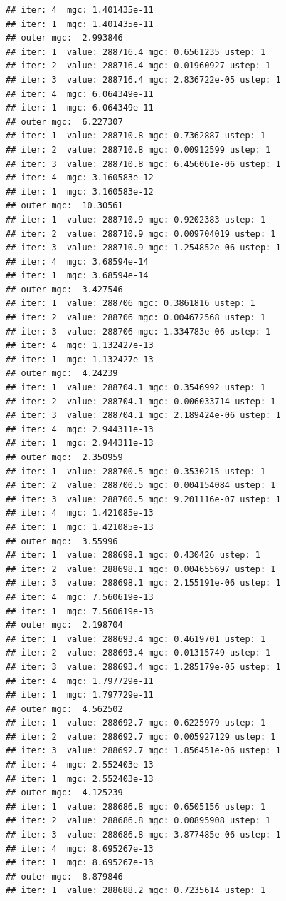\documentclass{article}\usepackage[]{graphicx}\usepackage[]{xcolor}
\makeatletter
\newenvironment{kframe}{%
 \def\at@end@of@kframe{}%
 \ifinner\ifhmode%
  \def\at@end@of@kframe{\end{minipage}}%
  \begin{minipage}{\columnwidth}%
 \fi\fi%
 \def\FrameCommand##1{\hskip\@totalleftmargin \hskip-\fboxsep
 \colorbox{shadecolor}{##1}\hskip-\fboxsep
     \hskip-\linewidth \hskip-\@totalleftmargin \hskip\columnwidth}%
 \MakeFramed {\advance\hsize-\width
   \@totalleftmargin\z@ \linewidth\hsize
   \@setminipage}}%
 {\par\unskip\endMakeFramed%
 \at@end@of@kframe}
\newenvironment{knitrout}{}{} %
\makeatother
\begin{document}
\begin{knitrout}
\begin{kframe}
\begin{verbatim}
## iter: 4  mgc: 1.401435e-11 
## iter: 1  mgc: 1.401435e-11 
## outer mgc:  2.993846 
## iter: 1  value: 288716.4 mgc: 0.6561235 ustep: 1 
## iter: 2  value: 288716.4 mgc: 0.01960927 ustep: 1 
## iter: 3  value: 288716.4 mgc: 2.836722e-05 ustep: 1 
## iter: 4  mgc: 6.064349e-11 
## iter: 1  mgc: 6.064349e-11 
## outer mgc:  6.227307 
## iter: 1  value: 288710.8 mgc: 0.7362887 ustep: 1 
## iter: 2  value: 288710.8 mgc: 0.00912599 ustep: 1 
## iter: 3  value: 288710.8 mgc: 6.456061e-06 ustep: 1 
## iter: 4  mgc: 3.160583e-12 
## iter: 1  mgc: 3.160583e-12 
## outer mgc:  10.30561 
## iter: 1  value: 288710.9 mgc: 0.9202383 ustep: 1 
## iter: 2  value: 288710.9 mgc: 0.009704019 ustep: 1 
## iter: 3  value: 288710.9 mgc: 1.254852e-06 ustep: 1 
## iter: 4  mgc: 3.68594e-14 
## iter: 1  mgc: 3.68594e-14 
## outer mgc:  3.427546 
## iter: 1  value: 288706 mgc: 0.3861816 ustep: 1 
## iter: 2  value: 288706 mgc: 0.004672568 ustep: 1 
## iter: 3  value: 288706 mgc: 1.334783e-06 ustep: 1 
## iter: 4  mgc: 1.132427e-13 
## iter: 1  mgc: 1.132427e-13 
## outer mgc:  4.24239 
## iter: 1  value: 288704.1 mgc: 0.3546992 ustep: 1 
## iter: 2  value: 288704.1 mgc: 0.006033714 ustep: 1 
## iter: 3  value: 288704.1 mgc: 2.189424e-06 ustep: 1 
## iter: 4  mgc: 2.944311e-13 
## iter: 1  mgc: 2.944311e-13 
## outer mgc:  2.350959 
## iter: 1  value: 288700.5 mgc: 0.3530215 ustep: 1 
## iter: 2  value: 288700.5 mgc: 0.004154084 ustep: 1 
## iter: 3  value: 288700.5 mgc: 9.201116e-07 ustep: 1 
## iter: 4  mgc: 1.421085e-13 
## iter: 1  mgc: 1.421085e-13 
## outer mgc:  3.55996 
## iter: 1  value: 288698.1 mgc: 0.430426 ustep: 1 
## iter: 2  value: 288698.1 mgc: 0.004655697 ustep: 1 
## iter: 3  value: 288698.1 mgc: 2.155191e-06 ustep: 1 
## iter: 4  mgc: 7.560619e-13 
## iter: 1  mgc: 7.560619e-13 
## outer mgc:  2.198704 
## iter: 1  value: 288693.4 mgc: 0.4619701 ustep: 1 
## iter: 2  value: 288693.4 mgc: 0.01315749 ustep: 1 
## iter: 3  value: 288693.4 mgc: 1.285179e-05 ustep: 1 
## iter: 4  mgc: 1.797729e-11 
## iter: 1  mgc: 1.797729e-11 
## outer mgc:  4.562502 
## iter: 1  value: 288692.7 mgc: 0.6225979 ustep: 1 
## iter: 2  value: 288692.7 mgc: 0.005927129 ustep: 1 
## iter: 3  value: 288692.7 mgc: 1.856451e-06 ustep: 1 
## iter: 4  mgc: 2.552403e-13 
## iter: 1  mgc: 2.552403e-13 
## outer mgc:  4.125239 
## iter: 1  value: 288686.8 mgc: 0.6505156 ustep: 1 
## iter: 2  value: 288686.8 mgc: 0.00895908 ustep: 1 
## iter: 3  value: 288686.8 mgc: 3.877485e-06 ustep: 1 
## iter: 4  mgc: 8.695267e-13 
## iter: 1  mgc: 8.695267e-13 
## outer mgc:  8.879846 
## iter: 1  value: 288688.2 mgc: 0.7235614 ustep: 1 

\end{verbatim}
\end{kframe}
\end{knitrout}
\end{document}
